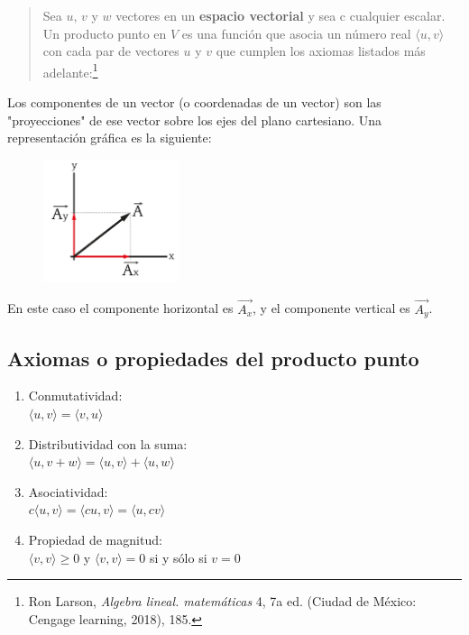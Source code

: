 \documentclass{article}
\begin{document}
    \begin{quote}
        Sea $u$, $v$ y $w$ vectores en un \textbf{espacio vectorial} y sea c cualquier escalar. Un producto punto en $V$ es una función que asocia un número real $\langle u, v\rangle$ con cada par de vectores $u$ y $v$ que cumplen los axiomas listados más adelante:\footnote{Ron Larson, \textit{Algebra lineal. matemáticas} 4, 7a ed. (Ciudad de México: Cengage learning, 2018), 185.}
    \end{quote}

    Los componentes de un vector (o coordenadas de un vector) son las "proyecciones" de ese vector sobre los ejes del plano cartesiano. Una representación gráfica es la siguiente:

    \begin{figure}[h]
        \centering
        \includegraphics[width=4cm]{img-1-componentes.png}
    \end{figure}

    En este caso el componente horizontal es $\vec{A_x}$, y el componente vertical es $\vec{A_y}$.

    \subsection{Axiomas o propiedades del producto punto}

    \begin{enumerate}

        \item Conmutatividad: \\
            $\langle u, v\rangle = \langle v, u\rangle$
        \item Distributividad con la suma: \\
            $\langle u, v + w\rangle = \langle u, v\rangle + \langle u, w\rangle$
        \item Asociatividad: \\
            $c\langle u, v\rangle=\langle c u, v\rangle=\langle u, c v\rangle$
        \item Propiedad de magnitud: \\
            $\langle v, v\rangle \geq 0$ y $\langle v, v\rangle = 0$ si y sólo si $v = 0$

    \end{enumerate}
\end{document}
